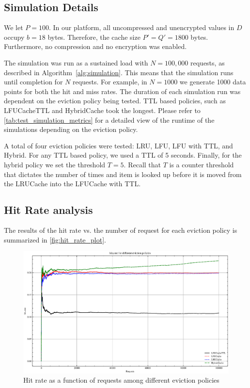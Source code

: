 \subsection{Simulation Details}
We let $P = 100$.
In our platform, all uncompressed and unencrypted
values in $D$ occupy $b = 18$ bytes.
Therefore, the cache size $P' = Q' = 1800$ bytes.
Furthermore, no compression and no encryption
was enabled.

The simulation was run as a sustained load
with $N = 100,000$ requests,
as described in Algorithm~\ref{alg:simulation}.
This means that the simulation runs until completion
for
$N$ requests. For example, in $N=1000$
we generate 1000 data points for both
the hit and miss rates. The duration
of each simulation run was dependent
on the eviction policy being tested.
TTL based policies, such as LFUCacheTTL
and HybridCache
took the longest. Please refer to \autoref{tab:test_simulation_metrics}
for a detailed view of the runtime of the simulations
depending on the eviction policy.

A total of four eviction policies were tested:
LRU, LFU, LFU with TTL, and Hybrid.
For any TTL based policy, we used a TTL of 5 seconds.
Finally, for the hybrid policy we set the threshold
$T = 5$. Recall that $T$ is a counter threshold
that dictates the number of times
and item is looked up before it is
moved from the LRUCache
into the LFUCache with TTL.

\subsection{Hit Rate analysis}
The results of the hit rate vs. the number
of request for each eviction policy is summarized
in \autoref{fig:hit_rate_plot}.

\begin{figure}[!htp]
    \centering
    \includegraphics[width=\textwidth]{images/hit_rate_plot.eps} %
    \caption{Hit rate as a function of requests among different eviction policies}
    \label{fig:hit_rate_plot}
\end{figure}

